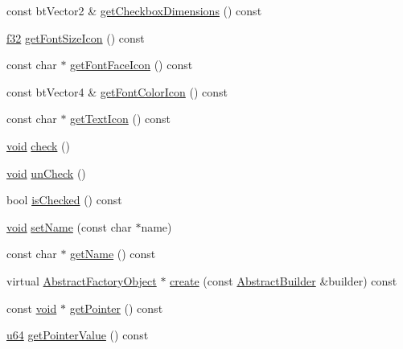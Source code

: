 \begin{DoxyCompactItemize}
\item 
const bt\+Vector2 \& \mbox{\hyperlink{classnjli_1_1_checkbox_h_u_d_ab0da419b8b5ede1ec19fdb21e110666d}{get\+Checkbox\+Dimensions}} () const
\item 
\mbox{\hyperlink{_util_8h_a5f6906312a689f27d70e9d086649d3fd}{f32}} \mbox{\hyperlink{classnjli_1_1_checkbox_h_u_d_a72d40dc4183170214df6f3d872e7f3de}{get\+Font\+Size\+Icon}} () const
\item 
const char $\ast$ \mbox{\hyperlink{classnjli_1_1_checkbox_h_u_d_a1c164e6cb1e76d95e17e8ed6f9f2bd23}{get\+Font\+Face\+Icon}} () const
\item 
const bt\+Vector4 \& \mbox{\hyperlink{classnjli_1_1_checkbox_h_u_d_acfe11aa6958e76646cc74e6e40c33fcd}{get\+Font\+Color\+Icon}} () const
\item 
const char $\ast$ \mbox{\hyperlink{classnjli_1_1_checkbox_h_u_d_a2c41c4503415cb8464fa57ebb400cbaf}{get\+Text\+Icon}} () const
\item 
\mbox{\hyperlink{_thread_8h_af1e856da2e658414cb2456cb6f7ebc66}{void}} \mbox{\hyperlink{classnjli_1_1_checkbox_h_u_d_ad543bafb52bd55a7143af7a9312d663a}{check}} ()
\item 
\mbox{\hyperlink{_thread_8h_af1e856da2e658414cb2456cb6f7ebc66}{void}} \mbox{\hyperlink{classnjli_1_1_checkbox_h_u_d_a6e4733ecf2b4e5e44cd8206af9bdc671}{un\+Check}} ()
\item 
bool \mbox{\hyperlink{classnjli_1_1_checkbox_h_u_d_a25b48e71d20e08b4560dbcc55b3838e1}{is\+Checked}} () const
\item 
\mbox{\hyperlink{_thread_8h_af1e856da2e658414cb2456cb6f7ebc66}{void}} \mbox{\hyperlink{classnjli_1_1_checkbox_h_u_d_a087eb5f8d9f51cc476f12f1d10a3cb95}{set\+Name}} (const char $\ast$name)
\item 
const char $\ast$ \mbox{\hyperlink{classnjli_1_1_checkbox_h_u_d_ad41266885be835f3ee602311e20877a4}{get\+Name}} () const
\item 
virtual \mbox{\hyperlink{classnjli_1_1_abstract_factory_object}{Abstract\+Factory\+Object}} $\ast$ \mbox{\hyperlink{classnjli_1_1_checkbox_h_u_d_a83a8876ae63b92804004cf3febe76573}{create}} (const \mbox{\hyperlink{classnjli_1_1_abstract_builder}{Abstract\+Builder}} \&builder) const
\item 
const \mbox{\hyperlink{_thread_8h_af1e856da2e658414cb2456cb6f7ebc66}{void}} $\ast$ \mbox{\hyperlink{classnjli_1_1_checkbox_h_u_d_ac4ca71716ed832be357f15f8262c8448}{get\+Pointer}} () const
\item 
\mbox{\hyperlink{_util_8h_ad758b7a5c3f18ed79d2fcd23d9f16357}{u64}} \mbox{\hyperlink{classnjli_1_1_checkbox_h_u_d_a4ffddf141a426a5a07d0ac19f1913811}{get\+Pointer\+Value}} () const

\end{DoxyCompactItemize}
